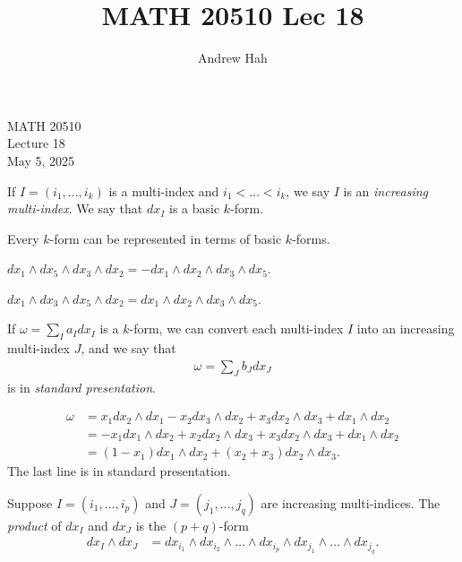 \documentclass[11pt]{article}
\title{MATH 20510 Lec 18}
\author{Andrew Hah}
\begin{document}
\pagestyle{plain}
\begin{center}
{\Large MATH 20510} \\
{\Large Lecture 18} \\
\vspace{.2in}
May 5, 2025
\end{center}

\begin{definition} If $I = (i_1, \dots, i_k)$ is a multi-index and $i_1 < \dots < i_k$, we say $I$ is an \emph{increasing multi-index}. We say that $dx_I$ is a basic $k$-form.
\end{definition}

\begin{remark} Every $k$-form can be represented in terms of basic $k$-forms.
\end{remark}

\begin{example} $dx_1 \wedge dx_5 \wedge dx_3 \wedge dx_2 = - dx_1 \wedge dx_2 \wedge dx_3 \wedge dx_5$.
\end{example}

\begin{example} $dx_1 \wedge dx_3 \wedge dx_5 \wedge dx_2 = dx_1 \wedge dx_2 \wedge dx_3 \wedge dx_5$.
\end{example}

\begin{definition} If $\omega = \sum_I a_I dx_I$ is a $k$-form, we can convert each multi-index $I$ into an increasing multi-index $J$, and we say that \begin{align*} \omega = \sum_J b_J dx_J
\end{align*} is in \emph{standard presentation}.
\end{definition}

\begin{example} \begin{align*} \omega & = x_1 dx_2 \wedge dx_1 - x_2dx_3 \wedge dx_2 + x_3 dx_2 \wedge dx_3 + dx_1 \wedge dx_2 \\ & = -x_1 dx_1 \wedge dx_2 + x_2 dx_2 \wedge dx_3 + x_3 dx_2 \wedge dx_3 + dx_1 \wedge dx_2 \\ & = (1 - x_1) dx_1 \wedge dx_2 + (x_2 + x_3) dx_2 \wedge dx_3.
\end{align*} The last line is in standard presentation.
\end{example}

\begin{definition} Suppose $I = (i_1, \dots, i_p)$ and $J = (j_1, \dots, j_q)$ are increasing multi-indices. The \emph{product} of $dx_I$ and $dx_J$ is the $(p + q)$-form \begin{align*} dx_I \wedge dx_J & = dx_{i_1} \wedge dx_{i_2} \wedge \dots \wedge dx_{i_p} \wedge dx_{j_1} \wedge \dots \wedge dx_{j_q}.
\end{align*}
\end{definition}
\end{document}

